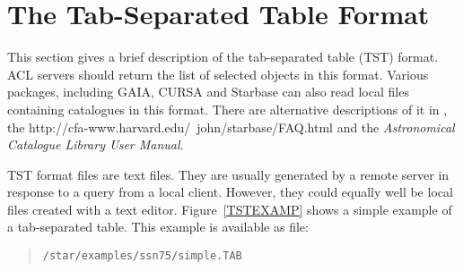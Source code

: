 \documentclass[twoside,11pt,nolof,chapters]{starlink}
\begin{document}
\section{\label{TST_R}The Tab-Separated Table Format}

This section gives a brief description of the tab-separated table (TST)
format.  ACL servers should return the list of selected objects in this
format.  Various packages, including GAIA, CURSA and Starbase can also
read local files containing catalogues in this format.  There are
alternative descriptions of it in \cite{SUN214},
the 
{http://cfa-www.harvard.edu/~john/starbase/FAQ.html}
and the \textit{Astronomical Catalogue Library User Manual}\/\cite{BRIGHTON98}.

TST format files are text files.  They are usually generated by a remote
server in response to a query from a local client.  However, they could
equally well be local files created with a text editor.
Figure~\ref{TSTEXAMP} shows a simple example of a tab-separated table.
This example is available as file:

\begin{verse}
\texttt{/star/examples/ssn75/simple.TAB}
\end{verse}
\end{document}
